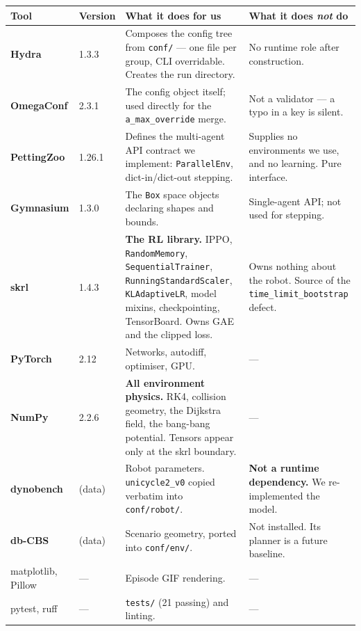 \documentclass[11pt,a4paper]{article}
\newcommand{\code}[1]{\texttt{\small #1}}
\begin{document}
\begin{center}
\footnotesize
\begin{tabular}{p{2.3cm}p{1.3cm}p{5.2cm}p{4.6cm}}
\toprule
\textbf{Tool} & \textbf{Version} & \textbf{What it does for us} & \textbf{What it does \emph{not} do} \\
\midrule
\textbf{Hydra} & 1.3.3
  & Composes the config tree from \code{conf/} --- one file per group, CLI overridable. Creates the run directory.
  & No runtime role after construction. \\
\addlinespace
\textbf{OmegaConf} & 2.3.1
  & The config object itself; used directly for the \code{a\_max\_override} merge.
  & Not a validator --- a typo in a key is silent. \\
\addlinespace
\textbf{PettingZoo} & 1.26.1
  & Defines the multi-agent API contract we implement: \code{ParallelEnv}, dict-in/dict-out stepping.
  & Supplies no environments we use, and no learning. Pure interface. \\
\addlinespace
\textbf{Gymnasium} & 1.3.0
  & The \code{Box} space objects declaring shapes and bounds.
  & Single-agent API; not used for stepping. \\
\addlinespace
\textbf{skrl} & 1.4.3
  & \textbf{The RL library.} IPPO, \code{RandomMemory}, \code{SequentialTrainer}, \code{RunningStandardScaler}, \code{KLAdaptiveLR}, model mixins, checkpointing, TensorBoard. Owns GAE and the clipped loss.
  & Owns nothing about the robot. Source of the \code{time\_limit\_bootstrap} defect. \\
\addlinespace
\textbf{PyTorch} & 2.12 & Networks, autodiff, optimiser, GPU. & --- \\
\addlinespace
\textbf{NumPy} & 2.2.6
  & \textbf{All environment physics.} RK4, collision geometry, the Dijkstra field, the bang-bang potential. Tensors appear only at the skrl boundary.
  & --- \\
\addlinespace
\textbf{dynobench} & (data)
  & Robot parameters. \code{unicycle2\_v0} copied verbatim into \code{conf/robot/}.
  & \textbf{Not a runtime dependency.} We re-implemented the model. \\
\addlinespace
\textbf{db-CBS} & (data)
  & Scenario geometry, ported into \code{conf/env/}.
  & Not installed. Its planner is a future baseline. \\
\addlinespace
matplotlib, Pillow & --- & Episode GIF rendering. & --- \\
pytest, ruff & --- & \code{tests/} (21 passing) and linting. & --- \\
\bottomrule
\end{tabular}
\end{center}
\end{document}
